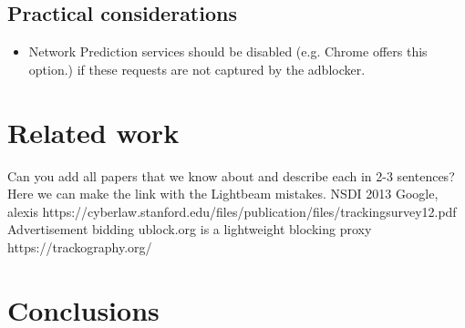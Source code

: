 \documentclass{sig-alternate}
\begin{document}
\subsection{Practical considerations}
\begin{itemize}
	\item Network Prediction services should be disabled (e.g. Chrome offers this option.) if these requests are not captured by the adblocker.
\end{itemize}

\section{Related work}
{\color{red}Can you add all papers that we know about and describe each in 2-3 sentences? Here we can make the link with the Lightbeam mistakes.}
NSDI 2013 Google, alexis
https://cyberlaw.stanford.edu/files/publication/files/trackingsurvey12.pdf
Advertisement bidding
ublock.org is a lightweight blocking proxy
https://trackography.org/

\section{Conclusions} \label{sec:conclusions}



\end{document}
